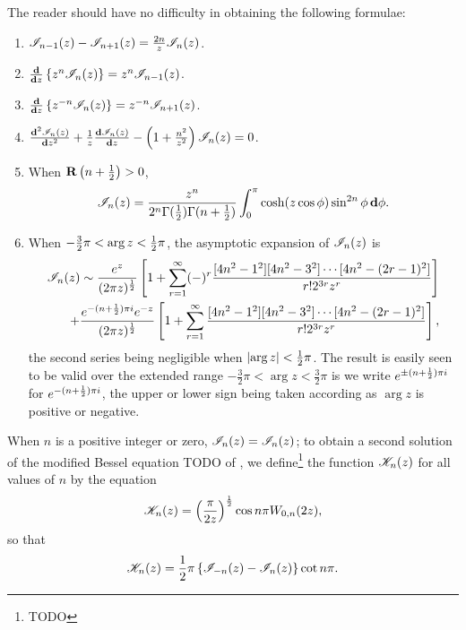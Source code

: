The reader should have no difficulty in obtaining the following
formulae:
\begin{enumerate}
\item $\mathscr{I}_{n-1}(z) - \mathscr{I}_{n+1}(z) = \frac{2n}{z} \mathscr{I}_{n}(z)$.
\item $\frac{\mathbf{d}}{\mathbf{d} z} \left\{ z^{n} \mathscr{I}_{n}(z) \right\} = z^{n} \mathscr{I}_{n-1}(z)$.
\item $\frac{\mathbf{d}}{\mathbf{d} z} \left\{ z^{-n} \mathscr{I}_{n}(z) \right\} = z^{-n} \mathscr{I}_{n+1}(z)$.
\item $\frac{\mathbf{d}^{2} \mathscr{I}_{n}(z)}{\mathbf{d} z^{2}} + \frac{1}{z} \frac{\mathbf{d}
    \mathscr{I}_{n}(z)}{\mathbf{d} z} -
  \left( 1 + \frac{n^{2}}{z^{2}} \right) \mathscr{I}_{n}(z) = 0$.
\item When $\operatorname{\mathbf{R}} \left( n + \frac{1}{2} \right) > 0$,
  $$
  \mathscr{I}_{n}(z)
  =
  \frac{z^{n}}{2^{n} \Gamma(\frac{1}{2}) \Gamma(n+\frac{1}{2})}
  \int_{0}^{\pi}
  \cosh (z\cos\phi) \sin^{2n} \phi \, \mathbf{d} \phi.
  $$
\item When $-\frac{3}{2}\pi < \arg z < \frac{1}{2} \pi$, the asymptotic
  expansion of $\mathscr{I}_{n}(z)$ is
  \begin{align*}
    \mathscr{I}_{n}(z)
    \sim
    \frac{ e^{z}}{ (2\pi z)^{\frac{1}{2}}}
    \left[ 
      1
      +
      \sum_{r=1}^{\infty} (-)^{r}
      \frac{[4n^{2}-1^{2}] [4n^{2} - 3^{2}] \cdots [4n^{2} - (2r-1)^{2}]}{r! 2^{3r} z^{r}}
     \right]
    \\
    +
    \frac{ e^{-(n+\frac{1}{2}) \pi i} e^{-z}}{ (2\pi z)^{\frac{1}{2}} }
    \left[ 
      1
      +
      \sum_{r=1}^{\infty}
      \frac{[4n^{2}-1^{2}] [4n^{2} - 3^{2}] \cdots [4n^{2} - (2r-1)^{2}]}{r! 2^{3r} z^{r}}
     \right],
  \end{align*}
  the second series being negligible when $\left| \arg z \right| < \frac{1}{2}
  \pi$. The result is easily seen to be valid over the extended
  range $-\frac{3}{2} \pi < \arg z < \frac{3}{2} \pi$ is we write
  $e^{\pm (n+\frac{1}{2})\pi i}$ for $e^{-(n+\frac{1}{2})\pi i}$, the upper or
  lower sign being taken according as $\arg z$ is positive or negative.
\end{enumerate}

When $n$ is a positive integer or zero, $\mathscr{I}_{n}(z) = \mathscr{I}_{n}(z)$;
to obtain a second solution of the modified Bessel equation TODO
of , we define\footnote{TODO} the function
$\mathscr{K}_{n}(z)$ for all values of $n$ by the equation
$$
\mathscr{K}_{n}(z)
=
\left( \frac{\pi}{2z} \right)^{\frac{1}{2}}
\cos n\pi
W_{0,n}(2z),
$$
so that
$$
\mathscr{K}_{n}(z) = \frac{1}{2} \pi \left\{ \mathscr{I}_{-n}(z) - \mathscr{I}_{n}(z) \right\} \cot n\pi.
$$

